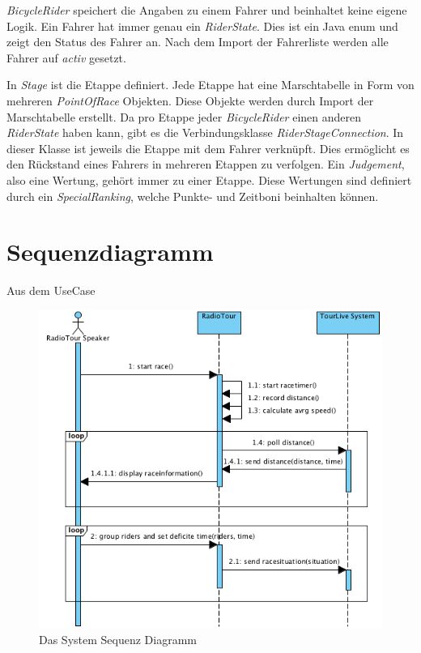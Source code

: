 \textit{BicycleRider} speichert die Angaben zu einem Fahrer und beinhaltet keine eigene Logik. Ein Fahrer hat immer genau ein \textit{RiderState}. Dies ist ein Java \gls{enum} und zeigt den Status des Fahrer an. Nach dem Import der Fahrerliste werden alle Fahrer auf \textit{activ} gesetzt.

In \textit{Stage} ist die Etappe definiert. Jede Etappe hat eine Marschtabelle in Form von mehreren \textit{PointOfRace} Objekten. Diese Objekte werden durch Import der Marschtabelle erstellt.
Da pro Etappe jeder \textit{BicycleRider} einen anderen \textit{RiderState} haben kann, gibt es die Verbindungsklasse \textit{RiderStageConnection}. In dieser Klasse ist jeweils die Etappe mit dem Fahrer verknüpft. Dies ermöglicht es den Rückstand eines Fahrers in mehreren Etappen zu verfolgen.
Ein \textit{Judgement}, also eine Wertung, gehört immer zu einer Etappe. Diese Wertungen sind definiert durch ein \textit{SpecialRanking}, welche Punkte- und Zeitboni beinhalten können.

\section{Sequenzdiagramm}
Aus dem UseCase 

\begin{figure}[h!]
\caption{Das System Sequenz Diagramm}
\label{fig:domain}
\centering
\includegraphics{05bericht/images/ssd_rennen.png}
\end{figure} 
